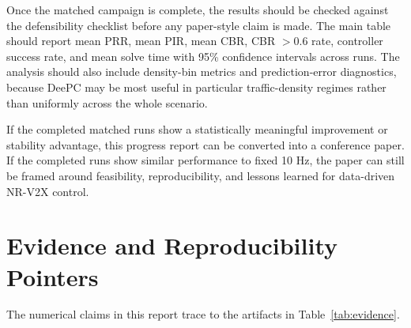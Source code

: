 \documentclass[11pt]{article}
\newcommand{\deePC}{DeePC}
\begin{document}
Once the matched campaign is complete, the results should be checked against
the defensibility checklist before any paper-style claim is made. The main
table should report mean PRR, mean PIR, mean CBR, CBR $> 0.6$ rate, controller
success rate, and mean solve time with 95\% confidence intervals across runs.
The analysis should also include density-bin metrics and prediction-error
diagnostics, because \deePC{} may be most useful in particular traffic-density
regimes rather than uniformly across the whole scenario.

If the completed matched runs show a statistically meaningful improvement or
stability advantage, this progress report can be converted into a conference
paper. If the completed runs show similar performance to fixed 10 Hz, the paper
can still be framed around feasibility, reproducibility, and lessons learned
for data-driven NR-V2X control.

\section{Evidence and Reproducibility Pointers}

The numerical claims in this report trace to the artifacts in
Table~\ref{tab:evidence}.
\end{document}
